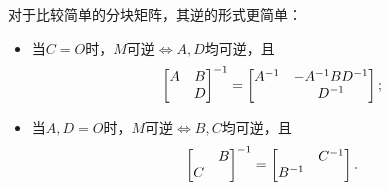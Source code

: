 \begin{corollary}
	对于比较简单的分块矩阵，其逆的形式更简单：
	\begin{itemize}
		\item 当$C=O$时，$M$可逆$\iff A,D$均可逆，且
		\begin{equation}
			\begin{bmatrix}
				A&B\\ &D
			\end{bmatrix}^{-1}=\begin{bmatrix}
				A^{-1}&-A^{-1} BD^{-1}\\
				& D^{-1}
			\end{bmatrix};
		\end{equation}
		\item 当$A,D=O$时，$M$可逆$\iff B,C$均可逆，且
		\begin{equation}
			\begin{bmatrix}
				&B\\C
			\end{bmatrix}^{-1}=\begin{bmatrix}
				&C^{-1}\\B^{-1}
			\end{bmatrix}.
		\end{equation}
	\end{itemize}
\end{corollary}

